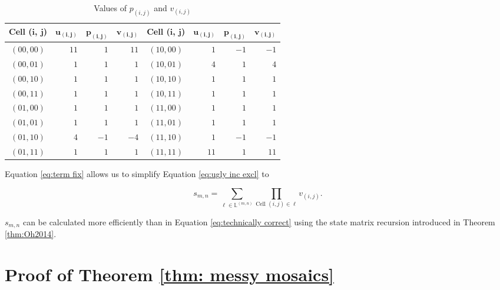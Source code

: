 \documentclass[12pt]{article}
\theoremstyle{plain}
\theoremstyle{definition}
\theoremstyle{remark}
\theoremstyle{definition}
\begin{document}
\begin{table}[h!]
    \begin{center}
        \begin{tabular}{ |c|r|r|r|c|r|r|r| } 
            \hline
            \textbf{Cell (}$\mathbf{i}$\textbf{,} $\mathbf{j}$\textbf{)} & $\mathbf{u_{(i,j)}}$ & $\mathbf{p_{(i,j)}}$ & $\mathbf{v_{(i,j)}}$ & \textbf{Cell (}$\mathbf{i}$\textbf{,} $\mathbf{j}$\textbf{)} & $\mathbf{u_{(i,j)}}$ & $\mathbf{p_{(i,j)}}$ & $\mathbf{v_{(i,j)}}$ \\ 
            \hline
            $(00, 00)$ & $11$ & $1$ & $11$ & $(10, 00)$ & $1$ & $-1$ & $-1$ \\
            \hline
            $(00, 01)$ & $1$ & $1$ & $1$ & $(10, 01)$ & $4$ & $1$ & $4$ \\
            \hline
            $(00, 10)$ & $1$ & $1$ & $1$ & $(10, 10)$ & $1$ & $1$ & $1$ \\
            \hline
            $(00, 11)$ & $1$ & $1$ & $1$ & $(10, 11)$ & $1$ & $1$ & $1$ \\
            \hline
            $(01, 00)$ & $1$ & $1$ & $1$ & $(11, 00)$ & $1$ & $1$ & $1$ \\
            \hline
            $(01, 01)$ & $1$ & $1$ & $1$ & $(11, 01)$ & $1$ & $1$ & $1$ \\
            \hline
            $(01, 10)$ & $4$ & $-1$ & $-4$ & $(11, 10)$ & $1$ & $-1$ & $-1$ \\
            \hline
            $(01, 11)$ & $1$ & $1$ & $1$ & $(11, 11)$ & $11$ & $1$ & $11$ \\
            \hline
        \end{tabular}
        \caption{Values of $p_{(i,j)}$ and $v_{(i,j)}$}
        \label{tbl:values of p and v}
    \end{center}
\end{table}

Equation \ref{eq:term fix} allows us to simplify Equation \ref{eq:ugly inc excl} to

\begin{equation}
    s_{m,n} = \sum_{\ell \in \mathbb{L}^{(m,n)}} \prod_{\text{Cell }(i,j) \in \ell} v_{(i,j)}.
\label{eq:technically correct}
\end{equation}

$s_{m,n}$ can be calculated more efficiently than in Equation \ref{eq:technically correct} using the state matrix recursion introduced in Theorem \ref{thm:Oh2014}.

\section{Proof of Theorem \ref{thm: messy mosaics}}
\end{document}
